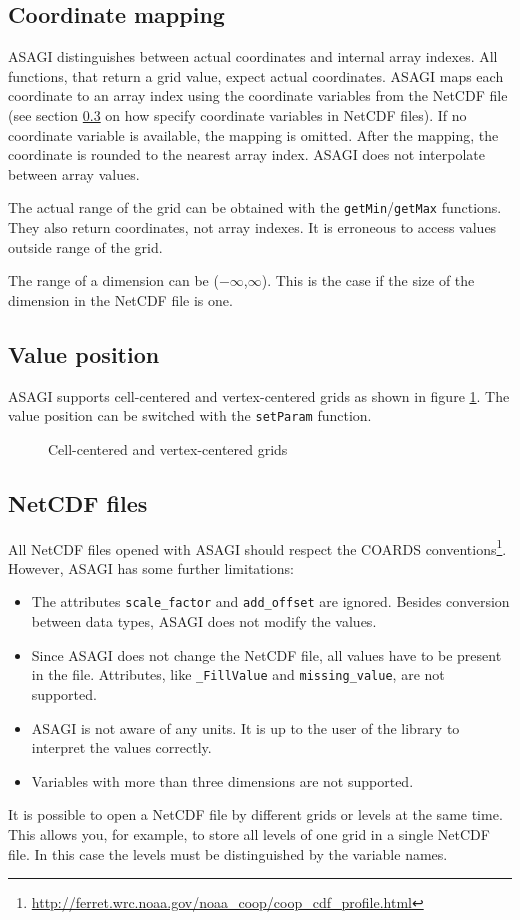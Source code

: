 \subsection{Coordinate mapping}

ASAGI distinguishes between actual coordinates and internal array indexes. All functions, that return a grid value, expect actual coordinates. ASAGI maps each coordinate to an array index using the coordinate variables from the NetCDF file (see section \ref{sec:netcdf files} on how specify coordinate variables in NetCDF files). If no coordinate variable is available, the mapping is omitted. After the mapping, the coordinate is rounded to the nearest array index. ASAGI does not interpolate between array values.

The actual range of the grid can be obtained with the \texttt{getMin}/\texttt{getMax} functions. They also return coordinates, not array indexes. It is erroneous to access values outside range of the grid.

The range of a dimension can be ($-\infty$,$\infty$). This is the case if the size of the dimension in the NetCDF file is one.

\subsection{Value position}

ASAGI supports cell-centered and vertex-centered grids as shown in figure \ref{fig:cell-centered vertex-centered}. The value position can be switched with the \texttt{setParam} function.

\begin{figure}[h]
 \def\xwidth{7}
 \def\ywidth{5}
 \def\scale{0.7}
 \centering
  \qquad
 \caption{Cell-centered and vertex-centered grids}
 \label{fig:cell-centered vertex-centered}
\end{figure}


\subsection{NetCDF files}
\label{sec:netcdf files}

All NetCDF files opened with ASAGI should respect the COARDS conventions\footnote{\url{http://ferret.wrc.noaa.gov/noaa_coop/coop_cdf_profile.html}}. However, ASAGI has some further limitations:
\begin{itemize}
 \item The attributes \texttt{scale\_factor} and \texttt{add\_offset} are ignored. Besides conversion between data types, ASAGI does not modify the values.
 \item Since ASAGI does not change the NetCDF file, all values have to be present in the file. Attributes, like \texttt{\_FillValue} and \texttt{missing\_value}, are not supported.
 \item ASAGI is not aware of any units. It is up to the user of the library to interpret the values correctly.
 \item Variables with more than three dimensions are not supported.
\end{itemize}

It is possible to open a NetCDF file by different grids or levels at the same time. This allows you, for example, to store all levels of one grid in a single NetCDF file. In this case the levels must be distinguished by the variable names.


